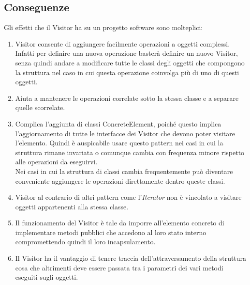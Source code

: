 \subsection{Conseguenze}
Gli effetti che il Visitor ha su un progetto software sono molteplici:
\begin{enumerate}
\item Visitor consente di aggiungere facilmente operazioni a oggetti complessi. Infatti per definire una nuova operazione basterà definire un nuovo Visitor, senza quindi andare a modificare tutte le classi degli oggetti che compongono la struttura nel caso in cui questa operazione coinvolga più di uno di questi oggetti.
\item Aiuta a mantenere le operazioni correlate sotto la stessa classe e a separare quelle scorrelate.
\item Complica l'aggiunta di classi ConcreteElement, poiché questo implica l'aggiornamento di tutte le interfacce dei Visitor che devono poter visitare l'elemento. Quindi è auspicabile usare questo pattern nei casi in cui la struttura rimane invariata o comunque cambia con frequenza minore rispetto alle operazioni da eseguirvi.\\
Nei casi in cui la struttura di classi cambia frequentemente può diventare conveniente aggiungere le operazioni direttamente dentro queste classi.
\item Visitor al contrario di altri pattern come l'\textit{Iterator} non è vincolato a visitare oggetti appartenenti alla stessa classe.
\item Il funzionamento del Visitor è tale da imporre all'elemento concreto di implementare metodi pubblici che accedono al loro stato interno compromettendo quindi il loro incapsulamento.
\item Il Visitor ha il vantaggio di tenere traccia dell'attraversamento della struttura cosa che altrimenti deve essere passata tra i parametri dei vari metodi eseguiti sugli oggetti.
\end{enumerate}


 
